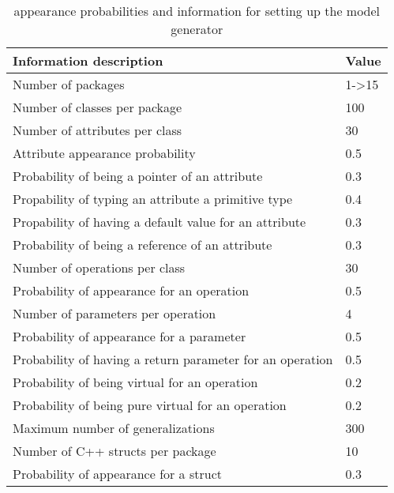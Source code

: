 \begin{table}[]
\centering
\caption{appearance probabilities and information for setting up the model generator}
\label{table:info-setup}
\begin{tabular}{|l|l|}
\hline
Information description                                   & Value            \\ \hline
Number of packages                                        & 1-\textgreater15 \\ \hline
Number of classes per package                             & 100              \\ \hline
Number of attributes per class                            & 30               \\ \hline
Attribute appearance probability                          & 0.5              \\ \hline
Probability of being a pointer of an attribute            & 0.3              \\ \hline
Propability of typing an attribute a primitive type       & 0.4              \\ \hline
Propability of having a default value for an attribute    & 0.3              \\ \hline
Probability of being a reference of an attribute          & 0.3              \\ \hline
Number of operations per class                            & 30               \\ \hline
Probability of appearance for an operation                & 0.5              \\ \hline
Number of parameters per operation                        & 4                \\ \hline
Probability of appearance for a parameter                 & 0.5              \\ \hline
Probability of having a return parameter for an operation & 0.5              \\ \hline
Probability of being virtual for an operation             & 0.2              \\ \hline
Probability of being pure virtual for an operation        & 0.2              \\ \hline
Maximum number of generalizations                         & 300              \\ \hline
Number of C++ structs per package                         & 10               \\ \hline
Probability of appearance for a struct                    & 0.3              \\ \hline

\end{tabular}
\end{table}
